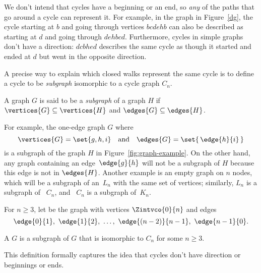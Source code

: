We don't intend that cycles have a beginning or an end, so \emph{any}
of the paths that go around a cycle can represent it.  For example, in
the graph in Figure~\ref{dg}, the cycle starting at $b$ and going
through vertices $bcdehb$ can also be described as starting at $d$ and
going through $dehbcd$.  Furthermore, cycles in simple graphs don't
have a direction: $dcbhed$ describes the same cycle as though it
started and ended at $d$ but went in the opposite direction.

A precise way to explain which closed walks represent the same cycle
is to define a cycle to be \emph{subgraph} isomorphic to a cycle graph
$C_n$.

\begin{definition}\label{def:subgraph}
  A graph $G$ is said to be a \emph{subgraph} of a graph $H$ if
  $\vertices{G} \subseteq \vertices{H}$ and $\edges{G} \subseteq
  \edges{H}$.
\end{definition}

For example, the one-edge graph $G$ where
\begin{equation*}
   \vertices{G} = \set{ g, h, i } \quad \text{and}\quad  \edges{G} =
   \set{\, \edge{h}{i} \, }
\end{equation*}
is a subgraph of the graph $H$ in Figure~\ref{fig:graph-example}.  On the
other hand, any graph containing an edge~$\edge{g}{h}$ will not be a
subgraph of $H$ because this edge is not in $\edges{H}$.  Another example
is an empty graph on $n$ nodes, which will be a subgraph of an~$L_n$ with
the same set of vertices; similarly, $L_n$ is a subgraph of ~$C_n$, and ~$C_n$ is
a subgraph of~$K_n$.

\begin{definition}
  For $n \ge 3$, let  be the graph with vertices
  $\Zintvco{0}{n}$ and edges
\[
\edge{0}{1},\ \edge{1}{2},\ \dots,\  \edge{(n-2)}{n-1},\ \edge{n-1}{0}.
\]

\iffalse
A graph is a \term{cycle} of length $n$ iff it is isomorphic to $C_n$
for some $n \ge 3$.
\fi

A  $G$ is a subgraph of $G$ that is
isomorphic to $C_n$ for some $n \ge 3$.
\end{definition}

This definition formally captures the idea that cycles don't
have direction or beginnings or ends.

\begin{problems}
\examproblems
{}

\homeworkproblems
{}
\end{problems}

